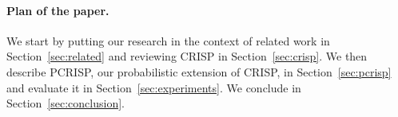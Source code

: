 \paragraph{Plan of the paper.} We start by putting our research in the
context of related work in Section~\ref{sec:related} and reviewing
CRISP in Section~\ref{sec:crisp}.  We then describe PCRISP, our
probabilistic extension of CRISP, in Section~\ref{sec:pcrisp} and
evaluate it in Section~\ref{sec:experiments}. We conclude in
Section~\ref{sec:conclusion}. 



